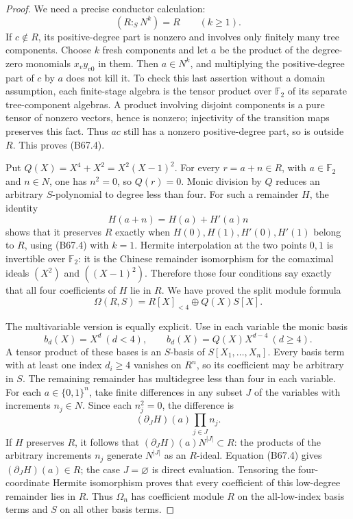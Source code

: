 \begin{proof}
We need a precise conductor calculation:
\[
                        (R:_S N^k)=R\qquad(k\ge1).        \tag{B67.4}
\]
If $c\notin R$, its positive-degree part is
nonzero and involves only finitely many tree
components. Choose $k$ fresh components and
let $a$ be the product of the degree-zero
monomials $x_vy_{v0}$ in them. Then $a\in N^k$,
and multiplying the positive-degree part of
$c$ by $a$ does not kill it. To check this
last assertion without a domain assumption,
each finite-stage algebra is the tensor
product over $\mathbb F_2$ of its separate
tree-component algebras. A product involving
disjoint components is a pure tensor of
nonzero vectors, hence is nonzero; injectivity
of the transition maps preserves this fact.
Thus $ac$ still has a nonzero positive-degree
part, so is outside $R$. This proves (B67.4).

Put $Q(X)=X^4+X^2=X^2(X-1)^2$. For every
$r=a+n\in R$, with $a\in\mathbb F_2$ and
$n\in N$, one has $n^2=0$, so $Q(r)=0$.
Monic division by $Q$ reduces an arbitrary
$S$-polynomial to degree less than four.
For such a remainder $H$, the identity
\[
                    H(a+n)=H(a)+H'(a)n
\]
shows that it preserves $R$ exactly when
$H(0),H(1),H'(0),H'(1)$ belong to $R$,
using (B67.4) with $k=1$.
Hermite interpolation at the two points $0,1$
is invertible over $\mathbb F_2$: it is the
Chinese remainder isomorphism for the
comaximal ideals $(X^2)$ and $((X-1)^2)$.
Therefore those four conditions say exactly
that all four coefficients of $H$ lie in $R$.
We have proved the split module formula
\[
                  \Omega(R,S)=R[X]_{<4}\oplus Q(X)S[X].  \tag{B67.5}
\]

The multivariable version is equally explicit.
Use in each variable the monic basis
\[
 b_d(X)=X^d\ (d<4),\qquad
 b_d(X)=Q(X)X^{d-4}\ (d\ge4).
\]
A tensor product of these bases is an
$S$-basis of $S[X_1,\ldots,X_n]$.
Every basis term with at least one index
$d_i\ge4$ vanishes on $R^n$, so its coefficient
may be arbitrary in $S$. The remaining
remainder has multidegree less than four in
each variable. For each $a\in\{0,1\}^n$,
take finite differences in any subset $J$
of the variables with increments $n_j\in N$.
Since each $n_j^2=0$, the difference is
\[
                      (\partial_J H)(a)\prod_{j\in J}n_j.
\]
If $H$ preserves $R$, it follows that
$(\partial_JH)(a)N^{|J|}\subset R$: the products of the arbitrary increments $n_j$ generate $N^{|J|}$ as an $R$-ideal.
Equation (B67.4) gives $(\partial_JH)(a)\in R$;
the case $J=\varnothing$ is direct evaluation.
Tensoring the four-coordinate Hermite
isomorphism proves that every coefficient
of this low-degree remainder lies in $R$.
Thus $\Omega_n$ has coefficient module $R$
on the all-low-index basis terms and $S$
on all other basis terms.


\end{proof}
